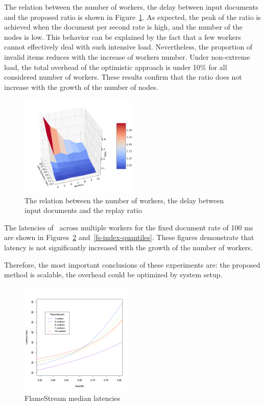 The relation between the number of workers, the delay between input documents and the proposed ratio is shown in Figure~\ref{overhead}. As expected, the peak of the ratio is achieved when the document per second rate is high, and the number of the nodes is low. This behavior can be explained by the fact that a few workers cannot effectively deal with such intensive load. Nevertheless, the proportion of invalid items reduces with the increase of workers number. Under non-extreme load, the total overhead of the optimistic approach is under 10\% for all considered number of workers. These results confirm that the ratio does not increase with the growth of the number of nodes.

\begin{figure}[htbp]
  \centering
  \includegraphics[width=0.5\textwidth]{pics/overhead}
  \caption{The relation between the number of workers, the delay between input documents and the replay ratio}
  \label {overhead}
\end{figure}

The latencies of \FlameStream\ across multiple workers for the fixed document rate of 100 ms are shown in Figures~\ref{fs-index-median} and~\ref{fs-index-quantiles}. These figures demonstrate that latency is not significantly increased with the growth of the number of workers. 

Therefore, the most important conclusions of these experiments are: the proposed method is scalable, the overhead could be optimized by system setup.

\begin{figure}[htbp]
  \centering
  \includegraphics[width=0.48\textwidth]{pics/fs-index-median}
  \caption{FlameStream median latencies}
  \label {fs-index-median}
\end{figure}

